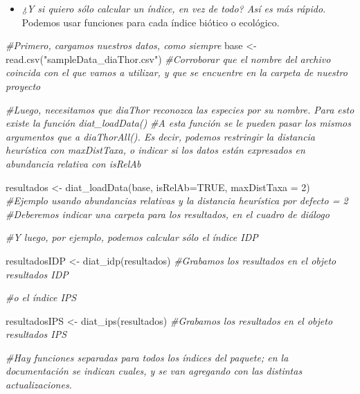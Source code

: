 \documentclass[
]{book}
\newenvironment{Shaded}{\begin{snugshade}}{\end{snugshade}}
\newcommand{\AttributeTok}[1]{\textcolor[rgb]{0.77,0.63,0.00}{#1}}
\newcommand{\CommentTok}[1]{\textcolor[rgb]{0.56,0.35,0.01}{\textit{#1}}}
\newcommand{\ConstantTok}[1]{\textcolor[rgb]{0.00,0.00,0.00}{#1}}
\newcommand{\DecValTok}[1]{\textcolor[rgb]{0.00,0.00,0.81}{#1}}
\newcommand{\FunctionTok}[1]{\textcolor[rgb]{0.00,0.00,0.00}{#1}}
\newcommand{\NormalTok}[1]{#1}
\newcommand{\OtherTok}[1]{\textcolor[rgb]{0.56,0.35,0.01}{#1}}
\newcommand{\StringTok}[1]{\textcolor[rgb]{0.31,0.60,0.02}{#1}}
\providecommand{\tightlist}{%
  \setlength{\itemsep}{0pt}\setlength{\parskip}{0pt}}
\begin{document}
\begin{itemize}
\tightlist
\item
  \emph{¿Y si quiero sólo calcular un índice, en vez de todo? Así es más rápido.}\\
  Podemos usar funciones para cada índice biótico o ecológico.
\end{itemize}

\begin{Shaded}
\begin{Highlighting}[]
\CommentTok{\#Primero, cargamos nuestros datos, como siempre}
\NormalTok{base }\OtherTok{\textless{}{-}} \FunctionTok{read.csv}\NormalTok{(}\StringTok{"sampleData\_diaThor.csv"}\NormalTok{) }\CommentTok{\#Corroborar que el nombre del archivo coincida con el que vamos a utilizar, y que se encuentre en la carpeta de nuestro proyecto}

\CommentTok{\#Luego, necesitamos que diaThor reconozca las especies por su nombre. Para esto existe la función diat\_loadData()}
\CommentTok{\#A esta función se le pueden pasar los mismos argumentos que a diaThorAll(). Es decir, podemos restringir la distancia heurística con \textquotesingle{}maxDistTaxa\textquotesingle{}, o indicar si los datos están expresados en abundancia relativa con \textquotesingle{}isRelAb\textquotesingle{}}

\NormalTok{resultados }\OtherTok{\textless{}{-}} \FunctionTok{diat\_loadData}\NormalTok{(base, }\AttributeTok{isRelAb=}\ConstantTok{TRUE}\NormalTok{, }\AttributeTok{maxDistTaxa =} \DecValTok{2}\NormalTok{) }\CommentTok{\#Ejemplo usando abundancias relativas y la distancia heurística por defecto = 2}
\CommentTok{\#Deberemos indicar una carpeta para los resultados, en el cuadro de diálogo }

\CommentTok{\#Y luego, por ejemplo, podemos calcular sólo el índice IDP}

\NormalTok{resultadosIDP }\OtherTok{\textless{}{-}} \FunctionTok{diat\_idp}\NormalTok{(resultados) }\CommentTok{\#Grabamos los resultados en el objeto resultados IDP}

\CommentTok{\#o el índice IPS}

\NormalTok{resultadosIPS }\OtherTok{\textless{}{-}} \FunctionTok{diat\_ips}\NormalTok{(resultados) }\CommentTok{\#Grabamos los resultados en el objeto resultados IPS}

\CommentTok{\#Hay funciones separadas para todos los índices del paquete; en la documentación se indican cuales, y se van agregando con las distintas actualizaciones.}
\end{Highlighting}
\end{Shaded}
\end{document}
